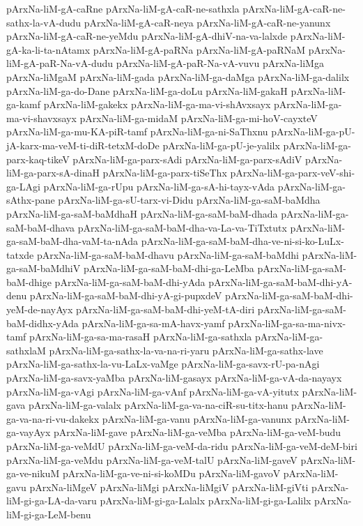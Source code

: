 {pArxNa-liM-gA-caRne
pArxNa-liM-gA-caR-ne-sathxla
pArxNa-liM-gA-caR-ne-sathx-la-vA-dudu
pArxNa-liM-gA-caR-neya
pArxNa-liM-gA-caR-ne-yanunx
pArxNa-liM-gA-caR-ne-yeMdu
pArxNa-liM-gA-dhiV-na-va-lalxde
pArxNa-liM-gA-ka-li-ta-nAtamx
pArxNa-liM-gA-paRNa
pArxNa-liM-gA-paRNaM
pArxNa-liM-gA-paR-Na-vA-dudu
pArxNa-liM-gA-paR-Na-vA-vuvu
pArxNa-liMga
pArxNa-liMgaM
pArxNa-liM-gada
pArxNa-liM-ga-daMga
pArxNa-liM-ga-dalilx
pArxNa-liM-ga-do-Dane
pArxNa-liM-ga-doLu
pArxNa-liM-gakaH
pArxNa-liM-ga-kamf
pArxNa-liM-gakekx
pArxNa-liM-ga-ma-vi-shAvxsayx
pArxNa-liM-ga-ma-vi-shavxsayx
pArxNa-liM-ga-midaM
pArxNa-liM-ga-mi-hoV-cayxteV
pArxNa-liM-ga-mu-KA-piR-tamf
pArxNa-liM-ga-ni-SaThxnu
pArxNa-liM-ga-pU-jA-karx-ma-veM-ti-diR-tetxM-doDe
pArxNa-liM-ga-pU-je-yalilx
pArxNa-liM-ga-parx-kaq-tikeV
pArxNa-liM-ga-parx-sAdi
pArxNa-liM-ga-parx-sAdiV
pArxNa-liM-ga-parx-sA-dinaH
pArxNa-liM-ga-parx-tiSeThx
pArxNa-liM-ga-parx-veV-shi-ga-LAgi
pArxNa-liM-ga-rUpu
pArxNa-liM-ga-sA-hi-tayx-vAda
pArxNa-liM-ga-sAthx-pane
pArxNa-liM-ga-sU-tarx-vi-Didu
pArxNa-liM-ga-saM-baMdha
pArxNa-liM-ga-saM-baMdhaH
pArxNa-liM-ga-saM-baM-dhada
pArxNa-liM-ga-saM-baM-dhava
pArxNa-liM-ga-saM-baM-dha-va-La-va-TiTxtutx
pArxNa-liM-ga-saM-baM-dha-vaM-ta-nAda
pArxNa-liM-ga-saM-baM-dha-ve-ni-si-ko-LuLx-tatxde
pArxNa-liM-ga-saM-baM-dhavu
pArxNa-liM-ga-saM-baMdhi
pArxNa-liM-ga-saM-baMdhiV
pArxNa-liM-ga-saM-baM-dhi-ga-LeMba
pArxNa-liM-ga-saM-baM-dhige
pArxNa-liM-ga-saM-baM-dhi-yAda
pArxNa-liM-ga-saM-baM-dhi-yA-denu
pArxNa-liM-ga-saM-baM-dhi-yA-gi-pupxdeV
pArxNa-liM-ga-saM-baM-dhi-yeM-de-nayAyx
pArxNa-liM-ga-saM-baM-dhi-yeM-tA-diri
pArxNa-liM-ga-saM-baM-didhx-yAda
pArxNa-liM-ga-sa-mA-havx-yamf
pArxNa-liM-ga-sa-ma-nivx-tamf
pArxNa-liM-ga-sa-ma-rasaH
pArxNa-liM-ga-sathxla
pArxNa-liM-ga-sathxlaM
pArxNa-liM-ga-sathx-la-va-na-ri-yaru
pArxNa-liM-ga-sathx-lave
pArxNa-liM-ga-sathx-la-vu-LaLx-vaMge
pArxNa-liM-ga-savx-rU-pa-nAgi
pArxNa-liM-ga-savx-yaMba
pArxNa-liM-gasayx
pArxNa-liM-ga-vA-da-nayayx
pArxNa-liM-ga-vAgi
pArxNa-liM-ga-vAnf
pArxNa-liM-ga-vA-yitutx
pArxNa-liM-gava
pArxNa-liM-ga-valalx
pArxNa-liM-ga-va-na-ciR-su-titx-hanu
pArxNa-liM-ga-va-na-ri-vu-dakekx
pArxNa-liM-ga-vanu
pArxNa-liM-ga-vanunx
pArxNa-liM-ga-vayAyx
pArxNa-liM-gave
pArxNa-liM-ga-veMba
pArxNa-liM-ga-veM-budu
pArxNa-liM-ga-veMdU
pArxNa-liM-ga-veM-da-ridu
pArxNa-liM-ga-veM-deM-biri
pArxNa-liM-ga-veMdu
pArxNa-liM-ga-veM-talU
pArxNa-liM-gaveV
pArxNa-liM-ga-ve-nikuM
pArxNa-liM-ga-ve-ni-si-koMDu
pArxNa-liM-gavoV
pArxNa-liM-gavu
pArxNa-liMgeV
pArxNa-liMgi
pArxNa-liMgiV
pArxNa-liM-giVti
pArxNa-liM-gi-ga-LA-da-varu
pArxNa-liM-gi-ga-Lalalx
pArxNa-liM-gi-ga-Lalilx
pArxNa-liM-gi-ga-LeM-benu
}
